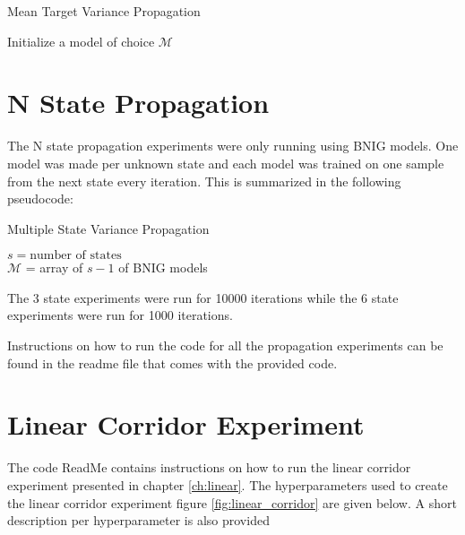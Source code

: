 {{\begin{algorithm}[H]
    \caption{Mean Target Variance Propagation}
    Initialize a model of choice $\mathcal{M}$\\
\end{algorithm}

\section{N State Propagation}\label{a:n_state_exp}

The N state propagation experiments were only running using BNIG models. One model was made per unknown state and each model was trained on one sample from the next state every iteration. This is summarized in the following pseudocode:

\begin{algorithm}[H]
    \caption{Multiple State Variance Propagation}
    $s = \text{number of states}$ \\
    $\mathcal{M}$ = array of $s-1$ of BNIG models\\
\end{algorithm}

The 3 state experiments were run for 10000 iterations while the 6 state experiments were run for 1000 iterations.

Instructions on how to run the code for all the propagation experiments can be found in the readme file that comes with the provided code.

\section{Linear Corridor Experiment}{\label{a:lin_corridor}}

The code ReadMe contains instructions on how to run the linear corridor experiment presented in chapter \ref{ch:linear}. The hyperparameters used to create the linear corridor experiment figure \ref{fig:linear_corridor}   are given below. A short description per hyperparameter is also provided

}}

